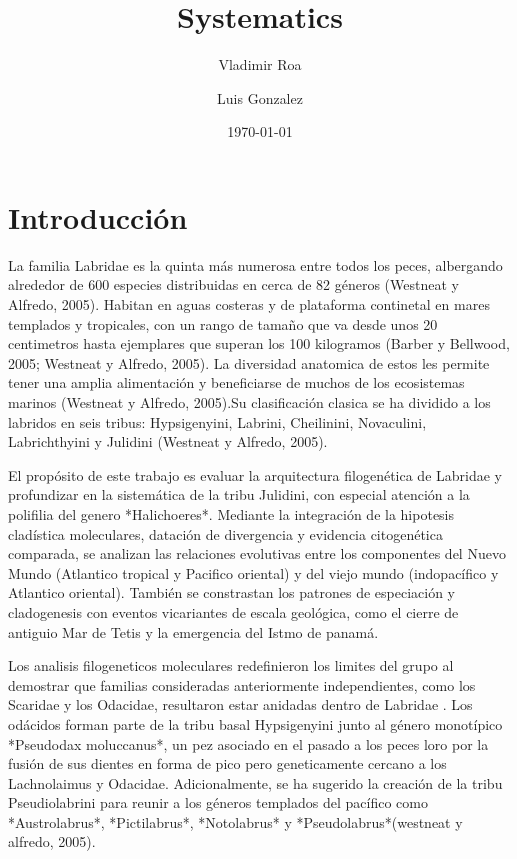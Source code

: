 \documentclass[12pt]{article}
\title{Systematics}
\author{Vladimir Roa}
\author{Luis Gonzalez}
\date{\today}
\begin{document}
\maketitle

\section{Introducción}

La familia Labridae es la quinta más numerosa entre todos los peces, albergando alrededor de 600 especies distribuidas en cerca de 82 géneros (Westneat y Alfredo, 2005). Habitan en aguas costeras y de plataforma continetal en mares templados y tropicales, con un rango de tamaño que va desde unos 20 centimetros hasta ejemplares que superan los 100 kilogramos (Barber y Bellwood, 2005; Westneat y Alfredo, 2005). La diversidad anatomica de estos les permite tener una amplia alimentación y beneficiarse de muchos de los ecosistemas marinos (Westneat y Alfredo, 2005).Su clasificación clasica se ha dividido a los labridos en seis tribus: Hypsigenyini, Labrini, Cheilinini, Novaculini, Labrichthyini y Julidini (Westneat y Alfredo, 2005).

El propósito de este trabajo es evaluar la arquitectura filogenética de Labridae y profundizar en la sistemática de la tribu Julidini, con especial atención a la polifilia del genero *Halichoeres*. Mediante la integración de la hipotesis cladística moleculares, datación de divergencia y evidencia citogenética comparada, se analizan las relaciones evolutivas entre los componentes del Nuevo Mundo (Atlantico tropical y Pacifico oriental) y del viejo mundo (indopacífico y Atlantico oriental). También se constrastan los patrones de especiación y cladogenesis con eventos vicariantes de escala geológica, como el cierre de antiguio Mar de Tetis y la emergencia del Istmo de panamá.

Los analisis filogeneticos moleculares redefinieron los limites del grupo al demostrar que familias consideradas anteriormente independientes, como los Scaridae y los Odacidae, resultaron estar anidadas dentro de Labridae . Los odácidos forman parte de la tribu basal Hypsigenyini junto al género monotípico *Pseudodax moluccanus*, un pez asociado en el pasado a los peces loro por la fusión de sus dientes en forma de pico pero geneticamente cercano a los Lachnolaimus y Odacidae. Adicionalmente, se ha sugerido la creación de la tribu Pseudiolabrini para reunir a los géneros templados del pacífico como *Austrolabrus*, *Pictilabrus*, *Notolabrus* y *Pseudolabrus*(westneat y alfredo, 2005).
\end{document}
